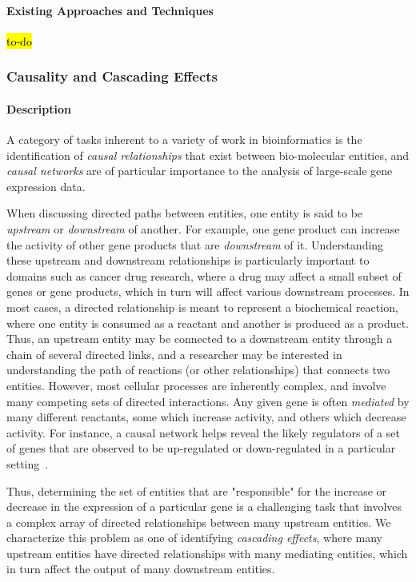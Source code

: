\paragraph{Existing Approaches and Techniques}

\hl{to-do}

\subsubsection{Causality and Cascading Effects}

\paragraph{Description}

A category of tasks inherent to a variety of work in bioinformatics is the identification of \textit{causal relationships} that exist between bio-molecular entities, and \emph{causal networks} are of particular importance to the analysis of large-scale gene expression data.

When discussing directed paths between entities, one entity is said to be \emph{upstream} or \emph{downstream} of another.
For example, one gene product can increase the activity of other gene products that are \emph{downstream} of it.
Understanding these upstream and downstream relationships is particularly important to domains such as cancer drug research, where a drug may affect a small subset of genes or gene products, which in turn will affect various downstream processes.
In most cases, a directed relationship is meant to represent a biochemical reaction, where one entity is consumed as a reactant and another is produced as a product.
Thus, an upstream entity may be connected to a downstream entity through a chain of several directed links, and a researcher may be interested in understanding the path of reactions (or other relationships) that connects two entities.
However, most cellular processes are inherently complex, and involve many competing sets of directed interactions.
Any given gene is often \textit{mediated} by many different reactants, some which increase activity, and others which decrease activity.
For instance, a causal network helps reveal the likely regulators of a set of genes that are observed to be up-regulated or down-regulated in a particular setting~\cite{felciano2013predictive, Kramer2013ipa-causal}.

Thus, determining the set of entities that are "responsible" for the increase or decrease in the expression of a particular gene is a challenging task that involves a complex array of directed relationships between many upstream entities.
We characterize this problem as one of identifying \textit{cascading effects}, where many upstream entities have directed relationships with many mediating entities, which in turn affect the output of many downstream entities.

